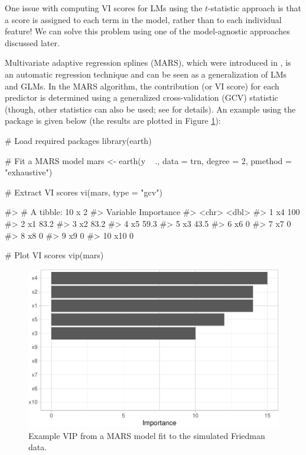 One issue with computing VI scores for LMs using the \(t\)-statistic
approach is that a score is assigned to each term in the model, rather
than to each individual feature! We can solve this problem using one of
the model-agnostic approaches discussed later.

Multivariate adaptive regression splines (MARS), which were introduced
in \citet{multivariate-friedman-1991}, is an automatic regression
technique and can be seen as a generalization of LMs and GLMs. In the
MARS algorithm, the contribution (or VI score) for each predictor is
determined using a generalized cross-validation (GCV) statistic (though,
other statistics can also be used; see  for
details). An example using the  package \citep{R-earth}
is given below (the results are plotted in Figure \ref{fig:vip-earth}):

\begin{Schunk}
\begin{Sinput}
# Load required packages
library(earth)

# Fit a MARS model
mars <- earth(y ~ ., data = trn, degree = 2, pmethod = "exhaustive")

# Extract VI scores
vi(mars, type = "gcv")
\end{Sinput}
\begin{Soutput}
#> # A tibble: 10 x 2
#>    Variable Importance
#>    <chr>         <dbl>
#>  1 x4            100  
#>  2 x1             83.2
#>  3 x2             83.2
#>  4 x5             59.3
#>  5 x3             43.5
#>  6 x6              0  
#>  7 x7              0  
#>  8 x8              0  
#>  9 x9              0  
#> 10 x10             0
\end{Soutput}
\begin{Sinput}
# Plot VI scores
vip(mars)
\end{Sinput}
\begin{figure}[!htb]

{\centering \includegraphics[width=0.7\linewidth]{greenwell-boehmke_files/figure-latex/vip-earth-1} 

}

\caption[Example VIP from a MARS model fit to the simulated Friedman data]{Example VIP from a MARS model fit to the simulated Friedman data.}\label{fig:vip-earth}
\end{figure}
\end{Schunk}

